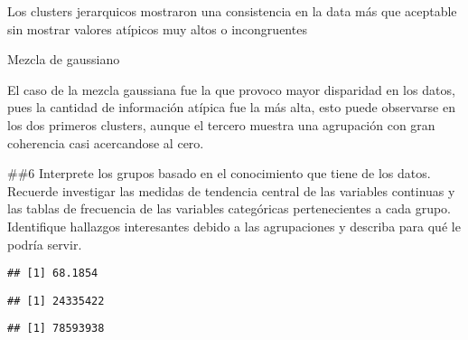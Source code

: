 \documentclass[
]{article}
\newenvironment{Shaded}{\begin{snugshade}}{\end{snugshade}}
\newcommand{\AttributeTok}[1]{\textcolor[rgb]{0.77,0.63,0.00}{#1}}
\newcommand{\ConstantTok}[1]{\textcolor[rgb]{0.00,0.00,0.00}{#1}}
\newcommand{\FunctionTok}[1]{\textcolor[rgb]{0.00,0.00,0.00}{#1}}
\newcommand{\NormalTok}[1]{#1}
\newcommand{\SpecialCharTok}[1]{\textcolor[rgb]{0.00,0.00,0.00}{#1}}
\begin{document}
Los clusters jerarquicos mostraron una consistencia en la data más que
aceptable sin mostrar valores atípicos muy altos o incongruentes

Mezcla de gaussiano

El caso de la mezcla gaussiana fue la que provoco mayor disparidad en
los datos, pues la cantidad de información atípica fue la más alta, esto
puede observarse en los dos primeros clusters, aunque el tercero muestra
una agrupación con gran coherencia casi acercandose al cero.

\#\#6 Interprete los grupos basado en el conocimiento que tiene de los
datos. Recuerde investigar las medidas de tendencia central de las
variables continuas y las tablas de frecuencia de las variables
categóricas pertenecientes a cada grupo. Identifique hallazgos
interesantes debido a las agrupaciones y describa para qué le podría
servir.

\begin{Shaded}
\end{Shaded}

\begin{verbatim}
## [1] 68.1854
\end{verbatim}

\begin{Shaded}
\end{Shaded}

\begin{verbatim}
## [1] 24335422
\end{verbatim}

\begin{Shaded}
\end{Shaded}

\begin{verbatim}
## [1] 78593938
\end{verbatim}
\end{document}
